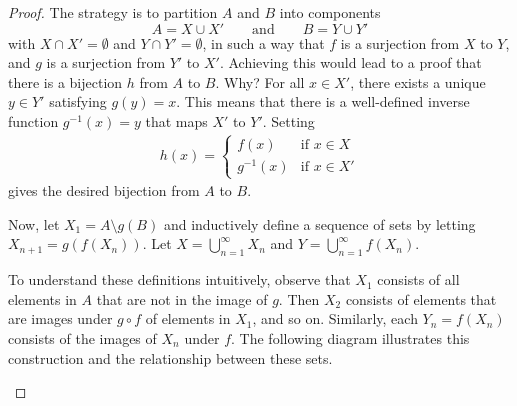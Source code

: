 \begin{proof}
  The strategy is to partition $A$ and $B$ into components
  \[ A = X \cup X' \qquad \text{and} \qquad B = Y \cup Y' \]
  with $X \cap X' = \emptyset$ and $Y \cap Y' = \emptyset$, in such a
  way that $f$ is a surjection from $X$ to $Y$, and $g$ is a
  surjection from $Y'$ to $X'$. Achieving this would lead to a proof
  that there is a bijection $h$ from $A$ to $B$. Why? For all $x \in
  X'$, there exists a unique $y \in Y'$ satisfying $g(y) = x$. This
  means that there is a well-defined inverse function $g^{-1}(x) = y$
  that maps $X'$ to $Y'$. Setting
  \begin{align*}
    h(x) =
    \begin{cases}
      f(x) & \text{if $x \in X$} \\
      g^{-1}(x) & \text{if $x \in X'$}
    \end{cases}
  \end{align*}
  gives the desired bijection from $A$ to $B$.

  Now, let $X_1 = A \setminus g(B)$ and inductively define a sequence
  of sets by letting $X_{n + 1} = g(f(X_n))$.  Let $X = \bigcup_{n =
  1}^{\infty} X_n$ and $Y = \bigcup_{n = 1}^{\infty} f(X_n)$.

  To understand these definitions intuitively, observe that $X_1$
  consists of all elements in $A$ that are not in the image of $g$.
  Then $X_2$ consists of elements that are images under $g \circ f$
  of elements in $X_1$, and so on. Similarly, each $Y_n = f(X_n)$
  consists of the images of $X_n$ under $f$. The following diagram
  illustrates this construction and the relationship between these sets.

  \begin{tightfigure}
    \centering
\end{tightfigure}
\end{proof}
